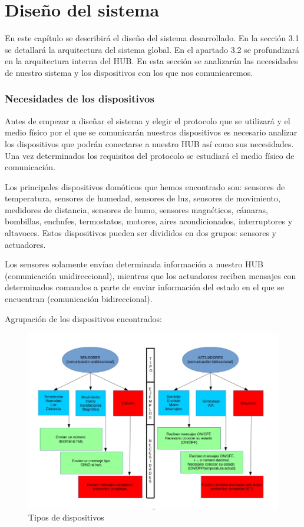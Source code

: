 \chapter{Diseño del sistema}
\label{chap:disenosistema}
En este capítulo se describirá el diseño del sistema desarrollado. 
En la sección 3.1 se detallará la arquitectura del sistema global. 
En el apartado 3.2 se profundizará en la arquitectura interna del HUB.
En esta sección se analizarán las necesidades de nuestro sistema y los dispositivos con los que nos comunicaremos.
\subsection{Necesidades de los dispositivos}
Antes de empezar a diseñar el sistema y elegir el protocolo que se utilizará y el medio físico por el que se comunicarán 
nuestros dispositivos es necesario analizar los dispositivos que podrán conectarse a nuestro HUB así como sus necesidades. 
Una vez determinados los requisitos del protocolo se estudiará el medio físico de comunicación.
\par
Los principales dispositivos domóticos que hemos encontrado son: sensores de temperatura, sensores de humedad, 
sensores de luz, sensores de movimiento, medidores de distancia, sensores de humo, sensores magnéticos, cámaras, 
bombillas, enchufes, termostatos, motores, aires acondicionados, interruptores y altavoces. Estos dispositivos
 pueden ser divididos en dos grupos: sensores y actuadores. 
\par
Los sensores solamente envían determinada información a nuestro HUB (comunicación unidireccional), 
mientras que los actuadores reciben mensajes con determinados comandos a parte de enviar información del estado 
en el que se encuentran (comunicación bidireccional).

Agrupación de los dispositivos encontrados:

\begin{figure}[H]
\centering
\includegraphics[width=6.00in]{images/descripcion_dispositivos.png}
\caption{Tipos de dispositivos}
\label{fig:descripcion_dispositivos}
\end{figure}


